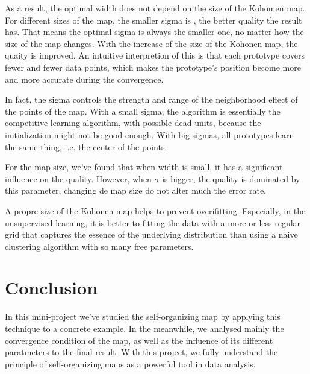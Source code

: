 \documentclass[a4paper, 12pt]{article}
\begin{document}
As a result, the optimal width does not depend on the size of the
Kohomen map. For different sizes of the map, the smaller sigma is ,
the better quality the result has. That means the optimal sigma is
always the smaller one, no matter how the size of the map
changes. With the increase of the size of the Kohonen map, the quaity
is improved. An intuitive interpretion of this is that each prototype
covers fewer and fewer data points, which makes the prototype's
position become more and more accurate during the convergence.

In fact, the sigma controls the strength and range of the neighborhood effect of the points of the map. With a small sigma, the algorithm is essentially the competitive learning algorithm, with possible dead units, because the initialization might not be good enough. With big sigmas, all prototypes learn the same thing, i.e. the center of the points.

For the map size, we've found that when width is small, it has a
significant influence on the quality. However, when $\sigma$ is
bigger, the quality is dominated by this parameter, changing de map
size do not alter much the error rate.

A propre size of the Kohonen map helps to prevent overifitting. Especially, in the unsupervised learning, it is better to fitting the data with a more or less regular grid that captures the essence of the underlying distribution than using a naive clustering algorithm with so many free parameters.

\section{Conclusion}

In this mini-project we've studied the self-organizing map by applying
this technique to a concrete example. In the meanwhile, we analysed
mainly the convergence condition of the map, as well as the influence of its
different paratmeters to the final result. With this project, we fully
understand the principle of self-organizing maps as a powerful tool in
data analysis.
\end{document}
